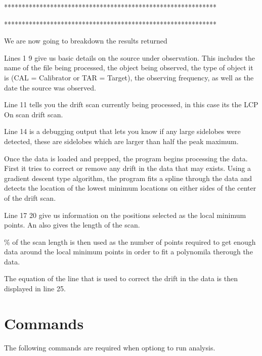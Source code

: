 \documentclass[letterpaper,10pt,english]{sphinxmanual}
\begin{document}
\begin{sphinxVerbatim}[commandchars=\\\{\},numbers=left,firstnumber=1,stepnumber=1]
************************************************************


************************************************************


\end{sphinxVerbatim}

\sphinxAtStartPar
We are now going to breakdown the results returned

\sphinxAtStartPar
Lines 1 \sphinxhyphen{} 9 give us basic details on the source under observation.
This includes the name of the file being processed, the object
being observed, the type of object it is (CAL = Calibrator or
TAR = Target), the observing frequency, as well as the date the
source was observed.

\sphinxAtStartPar
Line 11 tells you the drift scan currently being processed, in this
case its the LCP On scan drift scan.

\sphinxAtStartPar
Line 14 is a debugging output that lets you know if any large sidelobes
were detected, these are sidelobes which are larger than half the peak
maximum.

\sphinxAtStartPar
Once the data is loaded and prepped, the program begins processing
the data. First it tries to correct or remove any drift in the data
that may exists. Using a gradient descent type algorithm, the program
fits a spline through the data and detects the location of the lowest
minimum locations on either sides of the center of the drift scan.

\sphinxAtStartPar
Line 17 \sphinxhyphen{} 20 give us information on the positions selected as the
local minimum points. An also gives the length of the scan.

\% of the scan length is then used as the number of points required to
get enough data around the local minimum points in order to fit a
polynomila therough the data.

\sphinxAtStartPar
The equation of the line that is used to correct the drift in the data
is then displayed in line 25.

\sphinxstepscope


\section{Commands}
\label{\detokenize{extras/commands:commands}}\label{\detokenize{extras/commands::doc}}
\sphinxAtStartPar
The following commands are required when optiong to
run  analysis.



\renewcommand{\indexname}{Index}
\printindex
\end{document}
